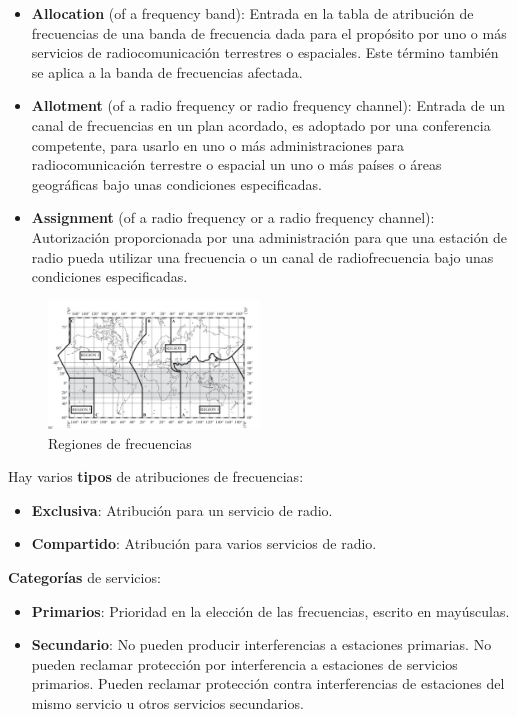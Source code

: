 \documentclass[10pt,portrait, twocolumn]{article}
\begin{document}
\begin{itemize}
	\item \textbf{Allocation} (of a frequency band): Entrada en la tabla de atribución de frecuencias de una banda de frecuencia dada para el propósito por uno o más servicios de radiocomunicación terrestres o espaciales. Este término también se aplica a la banda de frecuencias afectada.
	\item \textbf{Allotment} (of a radio frequency or radio frequency channel): Entrada de un canal de frecuencias en un plan acordado, es adoptado por una conferencia competente, para usarlo en uno o más administraciones para radiocomunicación terrestre o espacial un uno o más países o áreas geográficas bajo unas condiciones especificadas.
	\item \textbf{Assignment} (of a radio frequency or a radio frequency channel): Autorización proporcionada por una administración para que una estación de radio pueda utilizar una frecuencia o un canal de radiofrecuencia bajo unas condiciones especificadas.
\end{itemize}

\begin{figure}[h]
	\centering
     \includegraphics[width=0.5\textwidth]{Regiones}
      \caption{Regiones de frecuencias}
\end{figure}

Hay varios \textbf{tipos} de atribuciones de frecuencias:

	\begin{itemize}
		\item \textbf{Exclusiva}: Atribución para un servicio de radio.
		\item \textbf{Compartido}: Atribución para varios servicios de radio.
	\end{itemize}
	
\textbf{Categorías} de servicios:

	\begin{itemize}
		\item \textbf{Primarios}: Prioridad en la elección de las frecuencias, escrito en mayúsculas.
		\item \textbf{Secundario}: No pueden producir interferencias a estaciones primarias. No pueden reclamar protección por interferencia a estaciones de servicios primarios. Pueden reclamar protección contra interferencias de estaciones del mismo servicio u otros servicios secundarios.
	\end{itemize}
	
\end{document}
